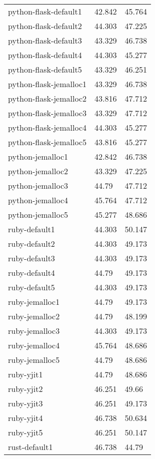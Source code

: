 \begin{longtable}[H]{|lll|}
python-flask-default1   & 42.842 & 45.764 \\
python-flask-default2   & 44.303 & 47.225 \\
python-flask-default3   & 43.329 & 46.738 \\
python-flask-default4   & 44.303 & 45.277 \\
python-flask-default5   & 43.329 & 46.251 \\
python-flask-jemalloc1  & 43.329 & 46.738 \\
python-flask-jemalloc2  & 43.816 & 47.712 \\
python-flask-jemalloc3  & 43.329 & 47.712 \\
python-flask-jemalloc4  & 44.303 & 45.277 \\
python-flask-jemalloc5  & 43.816 & 45.277 \\
python-jemalloc1        & 42.842 & 46.738 \\
python-jemalloc2        & 43.329 & 47.225 \\
python-jemalloc3        & 44.79  & 47.712 \\
python-jemalloc4        & 45.764 & 47.712 \\
python-jemalloc5        & 45.277 & 48.686 \\
ruby-default1           & 44.303 & 50.147 \\
ruby-default2           & 44.303 & 49.173 \\
ruby-default3           & 44.303 & 49.173 \\
ruby-default4           & 44.79  & 49.173 \\
ruby-default5           & 44.303 & 49.173 \\
ruby-jemalloc1          & 44.79  & 49.173 \\
ruby-jemalloc2          & 44.79  & 48.199 \\
ruby-jemalloc3          & 44.303 & 49.173 \\
ruby-jemalloc4          & 45.764 & 48.686 \\
ruby-jemalloc5          & 44.79  & 48.686 \\
ruby-yjit1              & 44.79  & 48.686 \\
ruby-yjit2              & 46.251 & 49.66  \\
ruby-yjit3              & 46.251 & 49.173 \\
ruby-yjit4              & 46.738 & 50.634 \\
ruby-yjit5              & 46.251 & 50.147 \\
rust-default1           & 46.738 & 44.79  \\

\end{longtable}
